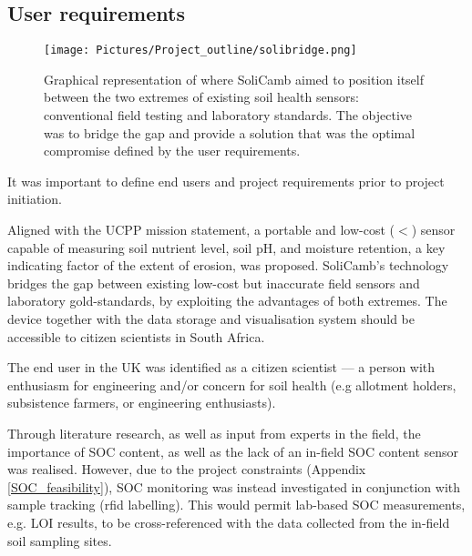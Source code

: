 \subsection{User requirements}

 \begin{figure}[h]
    \centering
    \texttt{[image: Pictures/Project\_outline/solibridge.png]}
    \captionsetup{justification = centering}
    \caption{Graphical representation of where SoliCamb aimed to position itself between the two extremes of existing soil health sensors: conventional field testing and laboratory standards. The objective was to bridge the gap and provide a solution that was the optimal compromise defined by the user requirements. }
    \label{fig:solibridge}
\end{figure}

It was important to define end users and project requirements prior to project initiation. 

Aligned with the \gls{UCPP} mission statement, a portable and low-cost ($<$) sensor capable of measuring soil nutrient level, soil pH, and moisture retention, a key indicating factor of the extent of erosion, was proposed. SoliCamb's technology  bridges the gap between existing low-cost but inaccurate field sensors and laboratory gold-standards, by exploiting the advantages of both extremes.  The device together with the data storage and visualisation system should be accessible to citizen scientists in South Africa.

 The end user in the UK was identified as a citizen scientist --- a person with enthusiasm for engineering and/or concern for soil health (e.g allotment holders, subsistence farmers, or engineering enthusiasts). %

Through literature research, as well as input from experts in the field, the importance of \gls{SOC} content, as well as the lack of an in-field \gls{SOC} content sensor was realised.  However, due to the project constraints (Appendix \cref{SOC_feasibility}), \gls{SOC} monitoring was instead investigated in conjunction with sample tracking (\gls{rfid} labelling). This would permit lab-based \gls{SOC} measurements, e.g. \gls{LOI} results, to be cross-referenced with the data collected from the in-field soil sampling sites. 

